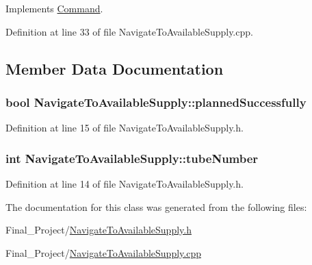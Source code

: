 Implements \hyperlink{classCommand_a9aa704d5f9d98f510a79e645701dc72a}{Command}.



Definition at line 33 of file Navigate\-To\-Available\-Supply.\-cpp.



\subsection{Member Data Documentation}
\hypertarget{classNavigateToAvailableSupply_a1a0c7849a339effc2ae36c80637ca336}{
\subsubsection[{planned\-Successfully}]{\setlength{\rightskip}{0pt plus 5cm}bool Navigate\-To\-Available\-Supply\-::planned\-Successfully\hspace{0.3cm}{\ttfamily [private]}}}\label{classNavigateToAvailableSupply_a1a0c7849a339effc2ae36c80637ca336}


Definition at line 15 of file Navigate\-To\-Available\-Supply.\-h.

\hypertarget{classNavigateToAvailableSupply_abe09e477255b0cc20b4138a31ee16de0}{
\subsubsection[{tube\-Number}]{\setlength{\rightskip}{0pt plus 5cm}int Navigate\-To\-Available\-Supply\-::tube\-Number\hspace{0.3cm}{\ttfamily [private]}}}\label{classNavigateToAvailableSupply_abe09e477255b0cc20b4138a31ee16de0}


Definition at line 14 of file Navigate\-To\-Available\-Supply.\-h.



The documentation for this class was generated from the following files\-:\begin{DoxyCompactItemize}
\item 
Final\-\_\-\-Project/\hyperlink{NavigateToAvailableSupply_8h}{Navigate\-To\-Available\-Supply.\-h}\item 
Final\-\_\-\-Project/\hyperlink{NavigateToAvailableSupply_8cpp}{Navigate\-To\-Available\-Supply.\-cpp}\end{DoxyCompactItemize}
